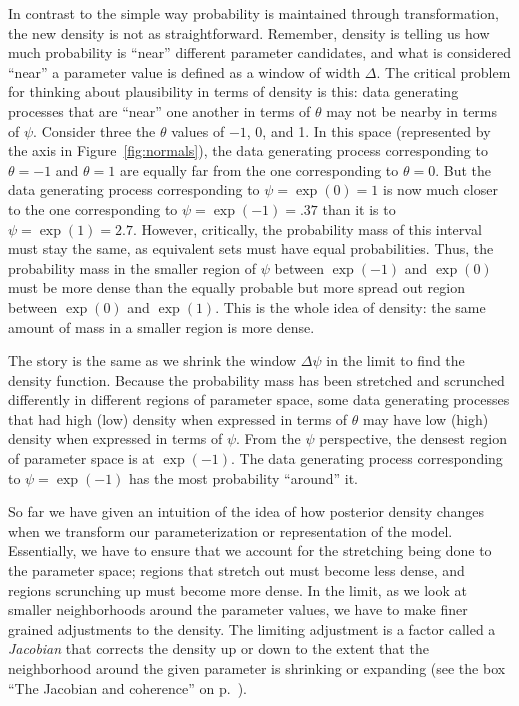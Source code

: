 \documentclass[man]{apa}
\begin{document}
In contrast to the simple way probability is maintained through transformation, the new density is not as straightforward.
Remember, density is telling us how much probability is ``near'' different parameter candidates, and what is considered ``near'' a parameter value is defined as a window of width $\Delta$.
The critical problem for thinking about plausibility in terms of density is this: data generating processes that are ``near'' one another in terms of $\theta$ may not be nearby in terms of $\psi$. 
Consider three the $\theta$ values of $-1$, 0, and 1. In this space (represented by the axis in Figure~\ref{fig:normals}), the data generating process corresponding to $\theta=-1$ and $\theta=1$ are equally far from the one corresponding to $\theta=0$.
But the data generating process corresponding to $\psi=\exp{(0)}=1$ is now much closer to the one corresponding to $\psi=\exp{(-1)} = .37$ than it is to $\psi=\exp{(1)}= 2.7$.
However, critically, the probability mass of this interval must stay the same, as equivalent sets must have equal probabilities. Thus, the probability mass in the smaller region of $\psi$ between $\exp{(-1)}$ and $\exp{(0)}$ must be more dense than the equally probable but more spread out region between $\exp{(0)}$ and $\exp{(1)}$. This is the whole idea of density: the same amount of mass in a smaller region is more dense. 

The story is the same as we shrink the window $\Delta\psi$ in the limit to find the density function. Because the probability mass has been stretched and scrunched differently in different regions of parameter space, some data generating processes that had high (low) density when expressed in terms of $\theta$ may have low (high) density when expressed in terms of $\psi$.
From the $\psi$ perspective, the densest region of parameter space is at $\exp{(-1)}$. The data generating process corresponding to $\psi=\exp{(-1)}$ has the most probability ``around'' it. 

So far we have given an intuition of the idea of how posterior density changes when we transform our parameterization or representation of the model. Essentially, we have to ensure that we account for the stretching being done to the parameter space; regions that stretch out must become less dense, and regions scrunching up must become more dense. 
In the limit, as we look at smaller neighborhoods around the parameter values, we have to make finer grained adjustments to the density. The limiting adjustment is a factor called a \textit{Jacobian} that corrects the density up or down to the extent that the neighborhood around the given parameter is shrinking or expanding (see the box ``The Jacobian and coherence'' on p.~\pageref{box:jacobian}). 
\end{document}
